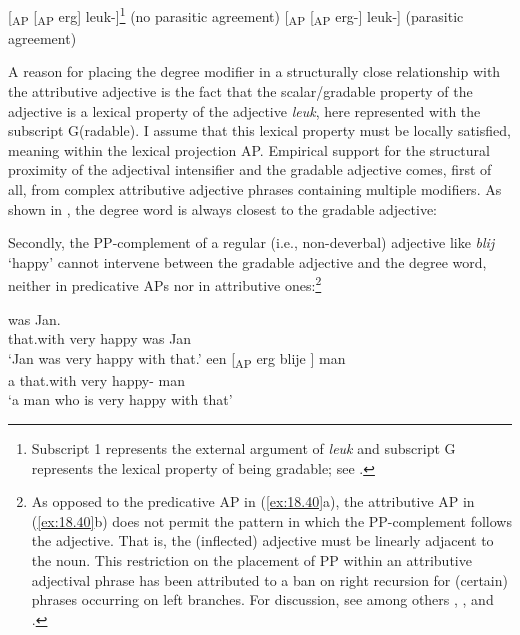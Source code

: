 \documentclass[output=paper]{langsci/langscibook}
\begin{document}
\ea%
    \label{ex:18.38}
    \ea {}[\textsubscript{AP} [\textsubscript{AP} erg]
    leuk\textsubscript{}-\Agr{}]\footnote{Subscript 1 represents the
    external argument of \emph{leuk} and subscript G represents the lexical
property of being gradable; see \textcite{Corver1997a}.} (no parasitic agreement)
	\ex {}[\textsubscript{AP} [\textsubscript{AP} erg-\Agr{}] leuk\textsubscript{}-\Agr{}]          (parasitic agreement)
	\z
\z

A reason for placing the degree modifier in a structurally close relationship
with the attributive adjective is the fact that the scalar/gradable property of
the adjective is a lexical property of the adjective \emph{leuk}, here
represented with the subscript G(radable). I assume that this lexical property
must be locally satisfied, meaning within the lexical projection AP. Empirical
support for the structural proximity of the adjectival intensifier and the
gradable adjective comes, first of all, from complex attributive adjective
phrases containing multiple modifiers. As shown in , the degree
word is always closest to the gradable adjective:

\ea%
    \label{ex:18.39}
	\z
\z

Secondly, the PP-complement of a regular (i.e., non-deverbal) adjective like
\emph{blij} \enquote*{happy} cannot intervene between the gradable adjective
and the degree word, neither in predicative APs nor in attributive
ones:\footnote{As opposed to the predicative AP in (\ref{ex:18.40}a), the
    attributive AP in (\ref{ex:18.40}b) does not permit the pattern in which the
    PP-complement follows the adjective. That is, the (inflected) adjective
    must be linearly adjacent to the noun. This restriction on the placement of
    PP within an attributive adjectival phrase has been attributed to a ban on
right recursion for (certain) phrases occurring on left branches. For
discussion, see among others \citet{Emonds1976}, \citet{Williams1981}, and
\citet{fofc}.}

\ea%
    \label{ex:18.40}
	\ea
	 was Jan.\\
        {} \phantom{〈}that.with very {} happy {} {} was Jan\\
	\glt \enquote*{Jan was very happy with that.}
	\ex
	\gll    een [\textsubscript{AP}  erg  blije  ] man\\
            a {} \phantom{〈}that.with very {} happy-\Agr{} {} {} man\\
	\glt \enquote*{a man who is very happy with that}
	\z
\z
\end{document}
